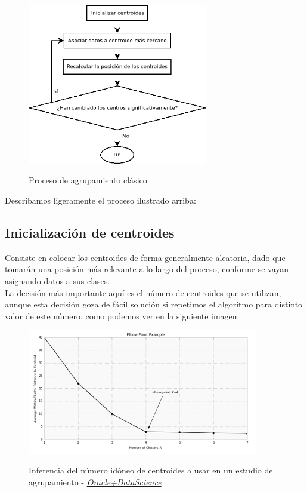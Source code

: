 \documentclass[]{report}
\begin{document}
			\begin{figure}[h]
				\centering
				\includegraphics[width=0.7\textwidth]{agrupamiento-clasico.png}
				\label{clustering-algorithm}
				\caption{Proceso de agrupamiento clásico}
			\end{figure}
		
			Describamos ligeramente el proceso ilustrado arriba:
			
			\subsection{Inicialización de centroides}
			
				Consiste en colocar los centroides de forma generalmente aleatoria, dado que tomarán una posición más relevante a lo largo del proceso, conforme se vayan asignando datos a sus clases.\\
				
				La decisión más importante aquí es el número de centroides que se utilizan, aunque esta decisión goza de fácil solución si repetimos el algoritmo para distinto valor de este número, como podemos ver en la siguiente imagen:
				
				\begin{figure}[h]
					\centering
					\includegraphics[width=0.9\textwidth]{k-means-oracle.png}
					\label{k-means-elbow-point}
					\caption{Inferencia del número idóneo de centroides a usar en un estudio de agrupamiento - \href{https://www.datascience.com/blog/k-means-clustering}{\textit{Oracle+DataScience}}}
				\end{figure}
				
\end{document}
